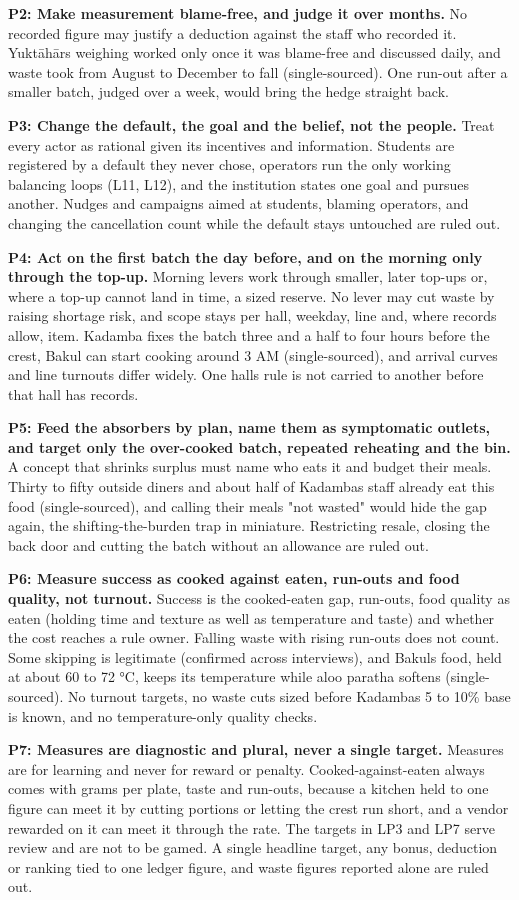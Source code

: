 \documentclass[
  10pt,
  table]{article}
\begin{document}
\textbf{P2: Make measurement blame-free, and judge it over months.} No recorded figure may justify a deduction against the staff who recorded it. Yuktāhār\textquotesingle s weighing worked only once it was blame-free and discussed daily, and waste took from August to December to fall (single-sourced). One run-out after a smaller batch, judged over a week, would bring the hedge straight back.

\textbf{P3: Change the default, the goal and the belief, not the people.} Treat every actor as rational given its incentives and information. Students are registered by a default they never chose, operators run the only working balancing loops (L11, L12), and the institution states one goal and pursues another. Nudges and campaigns aimed at students, blaming operators, and changing the cancellation count while the default stays untouched are ruled out.

\textbf{P4: Act on the first batch the day before, and on the morning only through the top-up.} Morning levers work through smaller, later top-ups or, where a top-up cannot land in time, a sized reserve. No lever may cut waste by raising shortage risk, and scope stays per hall, weekday, line and, where records allow, item. Kadamba fixes the batch three and a half to four hours before the crest, Bakul can start cooking around 3 AM (single-sourced), and arrival curves and line turnouts differ widely. One hall\textquotesingle s rule is not carried to another before that hall has records.

\textbf{P5: Feed the absorbers by plan, name them as symptomatic outlets, and target only the over-cooked batch, repeated reheating and the bin.} A concept that shrinks surplus must name who eats it and budget their meals. Thirty to fifty outside diners and about half of Kadamba\textquotesingle s staff already eat this food (single-sourced), and calling their meals "not wasted" would hide the gap again, the shifting-the-burden trap in miniature. Restricting resale, closing the back door and cutting the batch without an allowance are ruled out.

\textbf{P6: Measure success as cooked against eaten, run-outs and food quality, not turnout.} Success is the cooked-eaten gap, run-outs, food quality as eaten (holding time and texture as well as temperature and taste) and whether the cost reaches a rule owner. Falling waste with rising run-outs does not count. Some skipping is legitimate (confirmed across interviews), and Bakul\textquotesingle s food, held at about 60 to 72 °C, keeps its temperature while aloo paratha softens (single-sourced). No turnout targets, no waste cuts sized before Kadamba\textquotesingle s 5 to 10\% base is known, and no temperature-only quality checks.

\textbf{P7: Measures are diagnostic and plural, never a single target.} Measures are for learning and never for reward or penalty. Cooked-against-eaten always comes with grams per plate, taste and run-outs, because a kitchen held to one figure can meet it by cutting portions or letting the crest run short, and a vendor rewarded on it can meet it through the rate. The targets in LP3 and LP7 serve review and are not to be gamed. A single headline target, any bonus, deduction or ranking tied to one ledger figure, and waste figures reported alone are ruled out.
\end{document}
